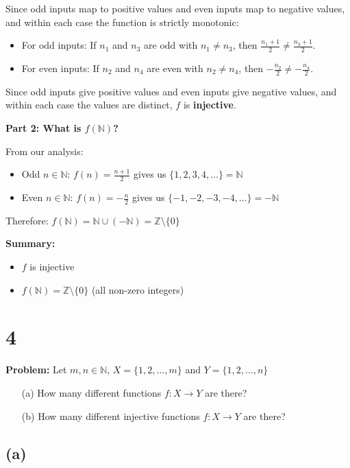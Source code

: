 \documentclass[12pt,a4paper]{article}
\theoremstyle{definition}
\theoremstyle{remark}
\begin{document}
Since odd inputs map to positive values and even inputs map to negative values, and within each case the function is strictly monotonic:

\begin{itemize}
\item For odd inputs: If $n_1$ and $n_3$ are odd with $n_1 \neq n_3$, then $\frac{n_1 + 1}{2} \neq \frac{n_3 + 1}{2}$.
\item For even inputs: If $n_2$ and $n_4$ are even with $n_2 \neq n_4$, then $-\frac{n_2}{2} \neq -\frac{n_4}{2}$.
\end{itemize}

Since odd inputs give positive values and even inputs give negative values, and within each case the values are distinct, $f$ is \textbf{injective}.

\textbf{Part 2: What is $f(\mathbb{N})$?}

From our analysis:
\begin{itemize}
\item Odd $n \in \mathbb{N}$: $f(n) = \frac{n + 1}{2}$ gives us $\{1, 2, 3, 4, \ldots\} = \mathbb{N}$
\item Even $n \in \mathbb{N}$: $f(n) = -\frac{n}{2}$ gives us $\{-1, -2, -3, -4, \ldots\} = -\mathbb{N}$
\end{itemize}

Therefore: $f(\mathbb{N}) = \mathbb{N} \cup (-\mathbb{N}) = \mathbb{Z} \setminus \{0\}$

\textbf{Summary:}
\begin{itemize}
\item $f$ is injective
\item $f(\mathbb{N}) = \mathbb{Z} \setminus \{0\}$ (all non-zero integers)
\end{itemize}


\section*{4}

\textbf{Problem:} Let $m, n \in \mathbb{N}$, $X = \{1, 2, \ldots, m\}$ and $Y = \{1, 2, \ldots, n\}$

\begin{enumerate}
\item[(a)] How many different functions $f : X \to Y$ are there?
\item[(b)] How many different injective functions $f : X \to Y$ are there?
\end{enumerate}

\subsection*{(a)}
\end{document}
